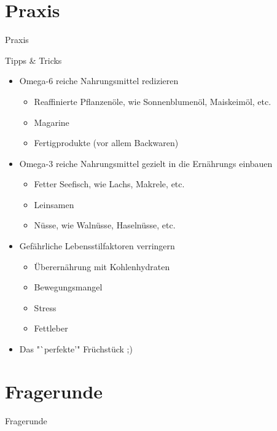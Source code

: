 \documentclass[xcolor=dvipsnames]{beamer}
\begin{document}
    \section{Praxis}
    {
        \begin{frame}
            \begin{center}
                \Huge Praxis
            \end{center}
        \end{frame}
    }

    \begin{frame}{Tipps \& Tricks}
        \begin{itemize}
            \setlength\itemsep{1em}
            \item Omega-6 reiche Nahrungsmittel redizieren
            \begin{itemize}
                \item Reaffinierte Pflanzenöle, wie Sonnenblumenöl, Maiskeimöl, etc.
                \item Magarine
                \item Fertigprodukte (vor allem Backwaren)
            \end{itemize}
            \item Omega-3 reiche Nahrungsmittel gezielt in die Ernährungs einbauen
            \begin{itemize}
                \item Fetter Seefisch, wie Lachs, Makrele, etc.
                \item Leinsamen
                \item Nüsse, wie Walnüsse, Haselnüsse, etc.
            \end{itemize}
            \item Gefährliche Lebensstilfaktoren verringern
            \begin{itemize}
                \item Überernährung mit Kohlenhydraten
                \item Bewegungsmangel
                \item Stress
                \item Fettleber
            \end{itemize}
            \item Das "`perfekte'" Früchstück ;)
        \end{itemize}
    \end{frame}

    \section{Fragerunde}
    {
        \begin{frame}
            \begin{center}
                \Huge Fragerunde
            \end{center}
        \end{frame}
    }
\end{document}
